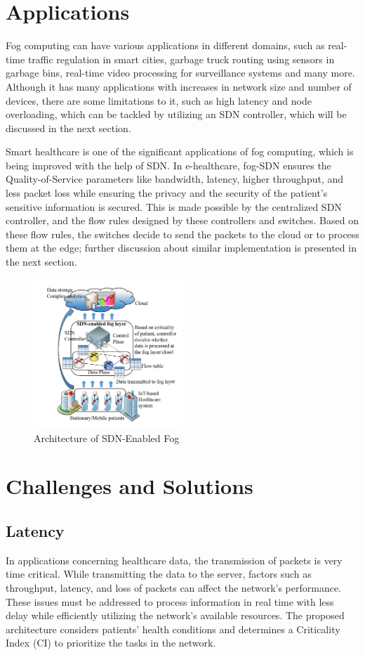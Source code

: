 \documentclass[conference]{IEEEtran}
\begin{document}
\section{Applications}
Fog computing can have various applications in different domains, such as real-time traffic regulation in smart cities, garbage truck routing using sensors in garbage bins, real-time video processing for surveillance systems and many more. Although it has many applications with increases in network size and number of devices, there are some limitations to it, such as high latency and node overloading, which can be tackled by utilizing an SDN controller, which will be discussed in the next section.

Smart healthcare is one of the significant applications of fog computing, which is being improved with the help of SDN. In e-healthcare, fog-SDN ensures the Quality-of-Service parameters like bandwidth, latency, higher throughput, and less packet loss while ensuring the privacy and the security of the patient’s sensitive information is secured. This is made possible by the centralized SDN controller, and the flow rules designed by these controllers and switches. Based on these flow rules, the switches decide to send the packets to the cloud or to process them at the edge; further discussion about similar implementation is presented in the next section.

\begin{figure}[h]
    \centering
    \includegraphics[width=0.5\textwidth]{Images/latency.png}
    \caption{Architecture of SDN-Enabled Fog}
    \label{fig:latency}
\end{figure}

\section{Challenges and Solutions}
\subsection{Latency}
In applications concerning healthcare data, the transmission of packets is very time critical. While transmitting the data to the server, factors such as throughput, latency, and loss of packets can affect the network's performance. These issues must be addressed to process information in real time with less delay while efficiently utilizing the network's available resources. The proposed architecture \cite{roy} considers patients' health conditions and determines a Criticality Index (CI) to prioritize the tasks in the network. 
\end{document}
